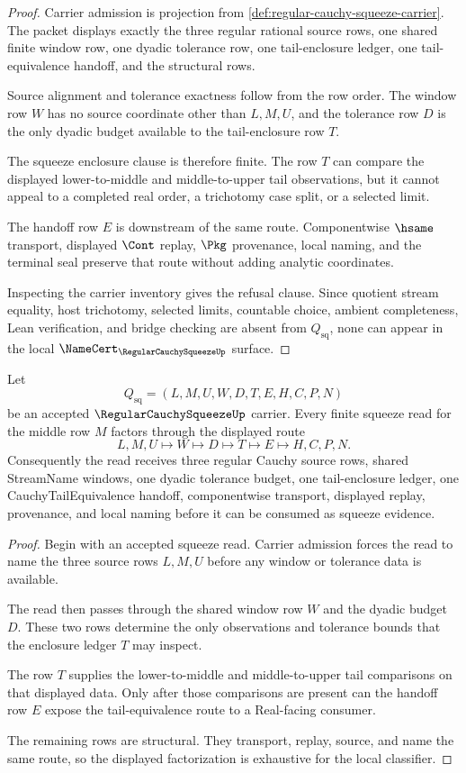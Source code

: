 \begin{proof}
Carrier admission is projection from \autoref{def:regular-cauchy-squeeze-carrier}. The packet displays exactly the three regular rational source rows, one shared finite window row, one dyadic tolerance row, one tail-enclosure ledger, one tail-equivalence handoff, and the structural rows.

Source alignment and tolerance exactness follow from the row order. The window row $W$ has no source coordinate other than $L,M,U$, and the tolerance row $D$ is the only dyadic budget available to the tail-enclosure row $T$.

The squeeze enclosure clause is therefore finite. The row $T$ can compare the displayed lower-to-middle and middle-to-upper tail observations, but it cannot appeal to a completed real order, a trichotomy case split, or a selected limit.

The handoff row $E$ is downstream of the same route. Componentwise $\hsame$ transport, displayed $\Cont$ replay, $\Pkg$ provenance, local naming, and the terminal seal preserve that route without adding analytic coordinates.

Inspecting the carrier inventory gives the refusal clause. Since quotient stream equality, host trichotomy, selected limits, countable choice, ambient completeness, Lean verification, and bridge checking are absent from $Q_{\mathrm{sq}}$, none can appear in the local $\NameCert_{\RegularCauchySqueezeUp}$ surface.
\end{proof}

\begin{theorem}
\label{thm:regular-cauchy-squeeze-tail-enclosure}
Let
$$
Q_{\mathrm{sq}}=(L,M,U,W,D,T,E,H,C,P,N)
$$
be an accepted $\RegularCauchySqueezeUp$ carrier. Every finite squeeze read for the middle row $M$ factors through the displayed route
$$
L,M,U \longmapsto W \longmapsto D \longmapsto T \longmapsto E \longmapsto H,C,P,N .
$$
Consequently the read receives three regular Cauchy source rows, shared StreamName windows, one dyadic tolerance budget, one tail-enclosure ledger, one CauchyTailEquivalence handoff, componentwise transport, displayed replay, provenance, and local naming before it can be consumed as squeeze evidence.
\end{theorem}
\begin{proof}
Begin with an accepted squeeze read. Carrier admission forces the read to name the three source rows $L,M,U$ before any window or tolerance data is available.

The read then passes through the shared window row $W$ and the dyadic budget $D$. These two rows determine the only observations and tolerance bounds that the enclosure ledger $T$ may inspect.

The row $T$ supplies the lower-to-middle and middle-to-upper tail comparisons on that displayed data. Only after those comparisons are present can the handoff row $E$ expose the tail-equivalence route to a Real-facing consumer.

The remaining rows are structural. They transport, replay, source, and name the same route, so the displayed factorization is exhaustive for the local classifier.
\end{proof}


